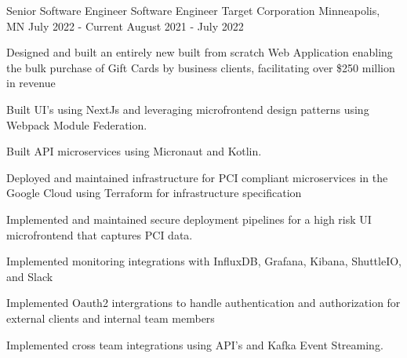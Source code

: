 

\begin{cventries}

  \cventrytarget
    {Senior Software Engineer} %
    {Software Engineer} %
    {Target Corporation}
    {Minneapolis, MN} %
    {July 2022 - Current} %
    {August 2021 - July 2022} %
    {
      \begin{cvitems} %
        \item {Designed and built an entirely new built from scratch Web Application enabling the bulk purchase of Gift Cards by business clients, facilitating over \$250 million in revenue}
        \item {Built UI's using NextJs and leveraging microfrontend design patterns using Webpack Module Federation.}
        \item {Built API microservices using Micronaut and Kotlin.}
        \item {Deployed and maintained infrastructure for PCI compliant microservices in the Google Cloud using Terraform for infrastructure specification}
        \item {Implemented and maintained secure deployment pipelines for a high risk UI microfrontend that captures PCI data.}
        \item {Implemented monitoring integrations with InfluxDB, Grafana, Kibana, ShuttleIO, and Slack}
        \item {Implemented Oauth2 intergrations to handle authentication and authorization for external clients and internal team members}
        \item {Implemented cross team integrations using API's and Kafka Event Streaming.}
      \end{cvitems}
    }


\end{cventries}
